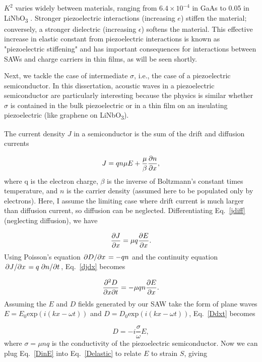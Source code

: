 \documentclass{beavtex_dub_edit}
\begin{document}
$K^2$ varies widely between materials, ranging from $6.4 \times 10^{-4}$ in GaAs \cite{wixforth_surface_1989} to 0.05 in LiNbO\textsubscript{3} \cite{warner_determination_1967}. Stronger piezoelectric interactions (increasing $e$) stiffen the material; conversely, a stronger dielectric (increasing $\epsilon$) softens the material. This effective increase in elastic constant from piezoelectric interactions is known as "piezoelectric stiffening" and has important consequences for interactions between SAWs and charge carriers in thin films, as will be seen shortly. 

Next, we tackle the case of intermediate $\sigma$, i.e., the case of a piezoelectric semiconductor. In this dissertation, acoustic waves in a piezoelectric semiconductor are particularly interesting because the physics is similar whether $\sigma$ is contained in the bulk piezoelectric or in a thin film on an insulating piezoelectric (like graphene on LiNbO\textsubscript{3}). 

The current density $J$ in a semiconductor is the sum of the drift and diffusion currents

\begin{equation}
    J = q n \mu E + \frac{\mu}{\beta} \pdv{n}{x}, \label{jdiff}
\end{equation}
where q is the electron charge, $\beta$ is the inverse of Boltzmann's constant times temperature, and $n$ is the carrier density (assumed here to be populated only by electrons). Here, I assume the limiting case where drift current is much larger than diffusion current, so diffusion can be neglected. Differentiating Eq.\ \ref{jdiff} (neglecting diffusion), we have

\begin{equation}
    \pdv{J}{x} = \mu q \pdv{E}{x}. \label{djdx}
\end{equation}
Using Poisson's equation $\pdv*{D}{x} = -qn$ and the continuity equation $\pdv*{J}{x} = q \pdv*{n}{t}$, Eq.\ \ref{djdx} becomes

\begin{equation}
    \pdv{D}{x}{t} = -\mu q n \pdv{E}{x}. \label{Ddxt}
\end{equation}
Assuming the $E$ and $D$ fields generated by our SAW take the form of plane waves $E = E_0 \mathrm{exp}(i(kx - \omega t))$ and $D = D_0 \mathrm{exp}(i(kx - \omega t))$, Eq.\ \ref{Ddxt} becomes

\begin{equation}
    D = -i\frac{\sigma}{\omega} E, \label{DinE}
\end{equation}
where $\sigma = \mu n q$ is the conductivity of the piezoelectric semiconductor. Now we can plug Eq.\ \ref{DinE} into Eq.\ \ref{Delastic} to relate $E$ to strain $S$, giving
\end{document}
